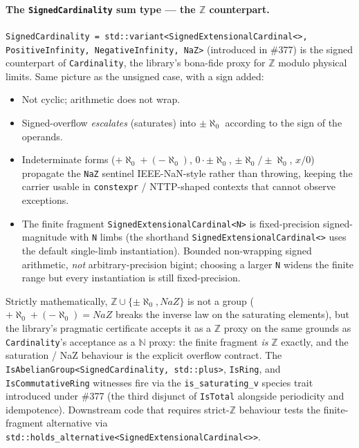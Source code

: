\documentclass[11pt, a4paper]{report}
\begin{document}
\paragraph{The \texttt{SignedCardinality} sum type --- the $\mathbb{Z}$ counterpart.}
\texttt{SignedCardinality = std::variant<SignedExtensionalCardinal<>, PositiveInfinity, NegativeInfinity, NaZ>} (introduced in \#377) is the signed counterpart of \texttt{Cardinality}, the library's bona-fide proxy for $\mathbb{Z}$ modulo physical limits. Same picture as the unsigned case, with a sign added:

\begin{itemize}
  \item Not cyclic; arithmetic does not wrap.
  \item Signed-overflow \emph{escalates} (saturates) into $\pm \aleph_0$ according to the sign of the operands.
  \item Indeterminate forms ($+\aleph_0 + (-\aleph_0)$, $0 \cdot \pm \aleph_0$, $\pm \aleph_0 / \pm \aleph_0$, $x / 0$) propagate the \texttt{NaZ} sentinel IEEE-NaN-style rather than throwing, keeping the carrier usable in \texttt{constexpr} / NTTP-shaped contexts that cannot observe exceptions.
  \item The finite fragment \texttt{SignedExtensionalCardinal<N>} is fixed-precision signed-magnitude with \texttt{N} limbs (the shorthand \texttt{SignedExtensionalCardinal<>} uses the default single-limb instantiation). Bounded non-wrapping signed arithmetic, \emph{not} arbitrary-precision bigint; choosing a larger \texttt{N} widens the finite range but every instantiation is still fixed-precision.
\end{itemize}

Strictly mathematically, $\mathbb{Z} \cup \{\pm \aleph_0, \mathit{NaZ}\}$ is not a group ($+\aleph_0 + (-\aleph_0) = \mathit{NaZ}$ breaks the inverse law on the saturating elements), but the library's pragmatic certificate accepts it as a $\mathbb{Z}$ proxy on the same grounds as \texttt{Cardinality}'s acceptance as a $\mathbb{N}$ proxy: the finite fragment \emph{is} $\mathbb{Z}$ exactly, and the saturation / NaZ behaviour is the explicit overflow contract. The \texttt{IsAbelianGroup<SignedCardinality, std::plus>}, \texttt{IsRing}, and \texttt{IsCommutativeRing} witnesses fire via the \texttt{is\_saturating\_v} species trait introduced under \#377 (the third disjunct of \texttt{IsTotal} alongside periodicity and idempotence). Downstream code that requires strict-$\mathbb{Z}$ behaviour tests the finite-fragment alternative via \texttt{std::holds\_alternative<SignedExtensionalCardinal<>>}.
\end{document}
